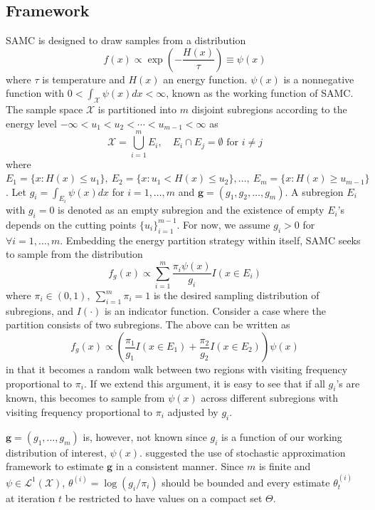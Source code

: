 \documentclass[article]{jss}
\newcommand{\vect}[1]{\boldsymbol{#1}}
\begin{document}
\subsection{Framework}\label{sec:framework}
SAMC is designed to draw samples from a distribution
\begin{equation}\label{eq:density_propto}
    f(x)\propto \exp\left( -\frac{H(x)}{\tau}\right) \equiv \psi(x)
\end{equation}
where $\tau$ is temperature and $H(x)$ an energy function. $\psi(x)$ is a nonnegative function with $0 < \int_{\mathcal{X}} \psi(x) dx < \infty$, known as the working function of SAMC. The sample space $\mathcal{X}$ is partitioned into $m$ disjoint subregions according to the energy level $-\infty < u_1 < u_2 < \cdots <u_{m-1} < \infty$ as
\begin{equation}
    \mathcal{X} = \bigcup\limits_{i=1}^{m} E_{i},\quad E_i\cap E_j = \emptyset\textrm{ for }i\neq j
\end{equation}
where $E_1 = \lbrace x:H(x) \leq u_1 \rbrace,~E_2 = \lbrace x: u_1 < H(x) \leq u_2 \rbrace,\ldots,~E_m = \lbrace x: H(x) \geq u_{m-1} \rbrace$. Let $g_i = \int_{E_i} \psi(x)dx$ for $i=1,\ldots,m$ and $\vect{g}=(g_1,g_2,\ldots, g_m)$. A subregion $E_i$ with $g_i=0$ is denoted as an empty subregion and the existence of empty $E_i$'s depends on the cutting points $\lbrace u_i \rbrace_{i=1}^{m-1}$. For now, we assume $g_i > 0$ for $\forall i=1,\ldots,m $. Embedding the energy partition strategy within itself, SAMC seeks to sample from the distribution
\begin{equation}\label{eq:SAMC}
    f_g(x) \propto \sum_{i=1}^m \frac{\pi_i \psi(x)}{g_i} I(x\in E_i)
\end{equation}
where $\pi_i \in (0,1),~\sum_{i=1}^m \pi_i = 1$ is the desired sampling distribution of subregions, and $I(\cdot)$ is an indicator function. Consider a case where the partition consists of two subregions. The above can be written as
\begin{equation}
    f_g(x)\propto  \left( \frac{\pi_1}{g_1} I(x\in E_1) + \frac{\pi_2}{g_2} I(x\in E_2) \right) \psi(x)
\end{equation}
in that it becomes a random walk between two regions with visiting frequency proportional to $\pi_i$. If we extend this argument, it is easy to see that if all $g_i$'s are known, this becomes to sample from $\psi(x)$ across different subregions with visiting frequency proportional to $\pi_i$ adjusted by $g_i$. 

$\vect{g}=(g_1,\ldots,g_m)$ is, however, not known since $g_i$ is a function of our working distribution of interest, $\psi(x)$. \cite{liang_stochastic_2007} suggested the use of stochastic approximation framework \citep{robbins_stochastic_1951} to estimate $\vect{g}$ in a consistent manner. Since $m$ is finite and $\psi \in \mathcal{L}^1(\mathcal{X})$, $\theta^{(i)} = \log(g_i/\pi_i)$ should be bounded and every estimate $\theta_t^{(i)}$ at iteration $t$ be restricted to have values on a compact set $\Theta$. 
\end{document}
